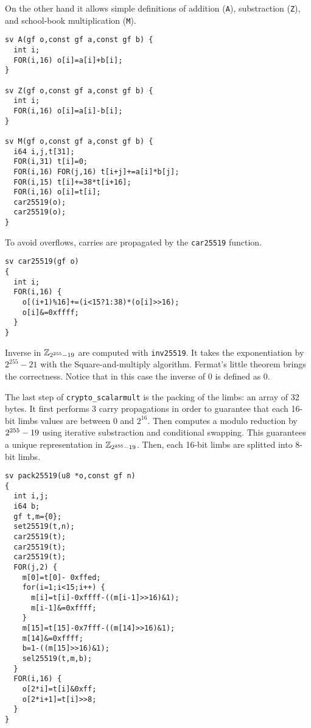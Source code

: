 On the other hand it allows simple definitions of addition (\texttt{A}),
substraction (\texttt{Z}), and school-book multiplication (\texttt{M}).
\begin{lstlisting}[language=Ctweetnacl]
sv A(gf o,const gf a,const gf b) {
  int i;
  FOR(i,16) o[i]=a[i]+b[i];
}

sv Z(gf o,const gf a,const gf b) {
  int i;
  FOR(i,16) o[i]=a[i]-b[i];
}

sv M(gf o,const gf a,const gf b) {
  i64 i,j,t[31];
  FOR(i,31) t[i]=0;
  FOR(i,16) FOR(j,16) t[i+j]+=a[i]*b[j];
  FOR(i,15) t[i]+=38*t[i+16];
  FOR(i,16) o[i]=t[i];
  car25519(o);
  car25519(o);
}
\end{lstlisting}

To avoid overflows, carries are propagated by the \texttt{car25519} function.
\begin{lstlisting}[language=Ctweetnacl]
sv car25519(gf o)
{
  int i;
  FOR(i,16) {
    o[(i+1)%16]+=(i<15?1:38)*(o[i]>>16);
    o[i]&=0xffff;
  }
}
\end{lstlisting}

Inverse in $\mathbb{Z}_{2^{255}-19}$ are computed with \texttt{inv25519}.
It takes the exponentiation by $2^{255}-21$ with the Square-and-multiply algorithm.
Fermat's little theorem brings the correctness.
Notice that in this case the inverse of $0$ is defined as $0$.


The last step of \texttt{crypto\_scalarmult} is the packing of the limbs: an array of 32 bytes.
It first performs 3 carry propagations in order to guarantee
that each 16-bit limbs values are between $0$ and $2^{16}$.
Then computes a modulo reduction by $2^{255}-19$ using iterative substraction and
conditional swapping. This guarantees a unique representation in $\mathbb{Z}_{2^{255}-19}$.
Then, each 16-bit limbs are splitted into 8-bit limbs.
\begin{lstlisting}[language=Ctweetnacl]
sv pack25519(u8 *o,const gf n)
{
  int i,j;
  i64 b;
  gf t,m={0};
  set25519(t,n);
  car25519(t);
  car25519(t);
  car25519(t);
  FOR(j,2) {
    m[0]=t[0]- 0xffed;
    for(i=1;i<15;i++) {
      m[i]=t[i]-0xffff-((m[i-1]>>16)&1);
      m[i-1]&=0xffff;
    }
    m[15]=t[15]-0x7fff-((m[14]>>16)&1);
    m[14]&=0xffff;
    b=1-((m[15]>>16)&1);
    sel25519(t,m,b);
  }
  FOR(i,16) {
    o[2*i]=t[i]&0xff;
    o[2*i+1]=t[i]>>8;
  }
}
\end{lstlisting}

